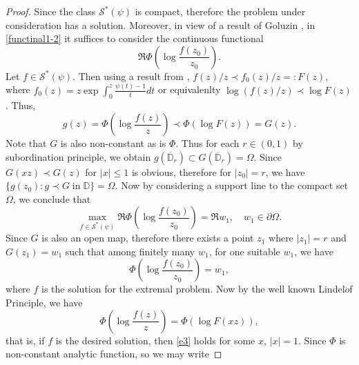\documentclass[12pt, reqno]{amsart}
\numberwithin{equation}{section}
\theoremstyle{plain}
\theoremstyle{definition}
\theoremstyle{remark}
\begin{document}
\begin{proof}
	Since the class $\mathcal{S}^{*}(\psi)$ is compact, therefore the problem under consideration has a solution. Moreover, in view of a result of Goluzin \cite{golu}, in \eqref{functinal1-2} it suffices to consider the continuous functional 
	\begin{equation*}
	\Re\Phi\left(\log\frac{f(z_0)}{z_0}\right).
	\end{equation*} 
	Let $f\in \mathcal{S}^{*}(\psi)$. Then using a result from \cite{minda94}, ${f(z)}/{z}\prec {f_0(z)}/{z}=:F(z),$
	where $	f_0(z)=z\exp\int_{0}^{z}\frac{\psi(t)-1}{t}dt$ or equivalenlty $\log(f(z)/z) \prec \log F(z)$. Thus, 
	\begin{equation*}
	g(z)=\Phi\left(\log\frac{f(z)}{z}\right) \prec \Phi(\log F(z))=G(z).
	\end{equation*}
	Note that $G$ is also non-constant as is $\Phi$. Thus for each $r\in (0,1)$ by subordination principle, we obtain $g({\mathbb{\overline{D}}_r}) \subset 	G({\mathbb{\overline{D}}_r})=\Omega.$
	Since $G(xz)\prec G(z)$ for $|x|\leq1$ is obvious, therefore for $|z_0|=r$, we have
	$\{g(z_0): g\prec G \;\text{in}\; \mathbb{D} \} = \Omega.$
	Now by considering a support line to the compact set $\Omega$, we conclude that
	\begin{equation*}
	\max_{f\in \mathcal{S}^{*}(\psi)} 
	\Re\Phi\left(\log\frac{f(z_0)}{z_0}\right)=\Re{w_1},\quad w_1\in\partial{\Omega}.
	\end{equation*}
	Since $G$ is also an open map, therefore there exists a point $z_1$ where $|z_1|=r$ and $G(z_1)=w_1$ such that among finitely many $w_1$, for one suitable $w_1$, we have
	\begin{equation*}
	\Phi\left(\log\frac{f(z_0)}{z_0}\right)=w_1,
	\end{equation*} 
	where $f$ is the solution for the extremal problem. Now by the well known Lindel$\ddot{o}$f Principle, we have 
	\begin{equation}\label{e3}
	\Phi\left(\log\frac{f(z)}{z}\right)= \Phi(\log{F(xz)}),
	\end{equation}
	that is, if $f$ is the desired solution, then \eqref{e3} holds for some $x$, $|x|=1$. Since $\Phi$ is non-constant analytic function, so we may write

\end{proof}
\end{document}
